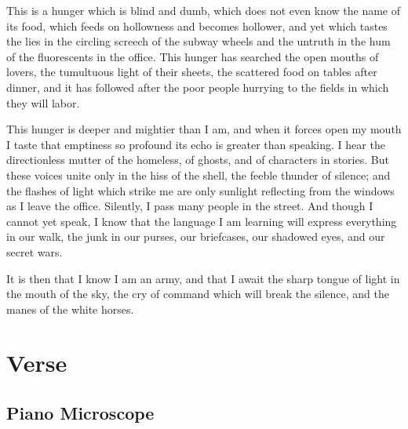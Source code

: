 \documentclass[english,11pt,letterpaper,onecolumn,parskip=full]{scrbook}
\begin{document}
	This is a hunger which is blind and dumb, which does not even know the name of its food, which feeds on hollowness and becomes hollower, and yet which tastes the lies in the circling screech of the subway wheels and the untruth in the hum of the fluorescents in the office.  This hunger has searched the open mouths of lovers, the tumultuous light of their sheets, the scattered food on tables after dinner, and it has followed after the poor people hurrying to the fields in which they will labor.

	This hunger is deeper and mightier than I am, and when it forces open my mouth I taste that emptiness so profound its echo is greater than speaking.  I hear the directionless mutter of the homeless, of ghosts, and of characters in stories.  But these voices unite only in the hiss of the shell, the feeble thunder of silence; and the flashes of light which strike me are only sunlight reflecting from the windows as I leave the office.  Silently, I pass many people in the street.  And though I cannot yet speak, I know that the language I am learning will express everything in our walk, the junk in our purses, our briefcases, our shadowed eyes, and our secret wars.

	It is then that I know I am an army, and that I await the sharp tongue of light in the mouth of the sky, the cry of command which will break the silence, and the manes of the white horses.


\chapter{Verse}

\newpage
\section{Piano Microscope}
\end{document}
